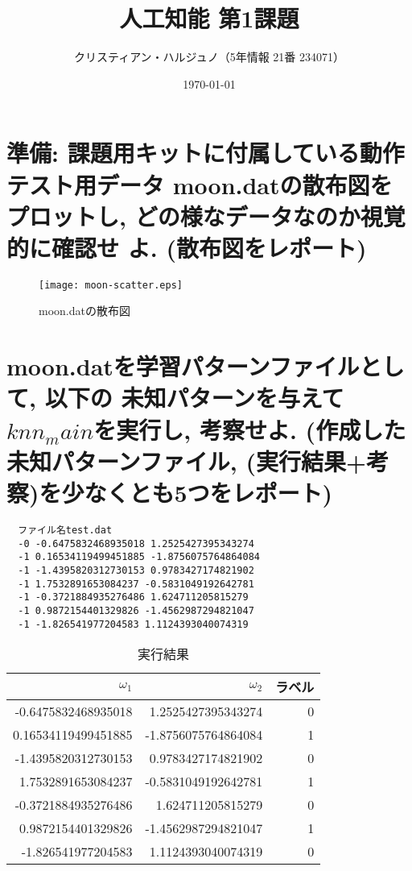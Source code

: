 \documentclass[a4j, 10pt]{jarticle}
\begin{document}
\begin{titlepage}
  
  \title{人工知能 第1課題}
  \author{クリスティアン・ハルジュノ（5年情報 21番 234071）}
  \date{\today}
  \maketitle
\end{titlepage}

\section{準備: 課題用キットに付属している動作テスト用データ moon.datの散布図をプロットし, どの様なデータなのか視覚的に確認せ
よ. (散布図をレポート)}
\begin{figure}[H]
  \centering
  \texttt{[image: moon-scatter.eps]}
  \caption{moon.datの散布図}\label{scatterplot}
\end{figure}

\section{moon.datを学習パターンファイルとして, 以下の 未知パターンを与えて$knn_main$を実行し, 考察せよ. (作成した未知パターンファイル, (実行結果+考察)を少なくとも5つをレポート)}

\begin{verbatim}
  ファイル名test.dat
  -0 -0.6475832468935018 1.2525427395343274
  -1 0.16534119499451885 -1.8756075764864084
  -1 -1.4395820312730153 0.9783427174821902
  -1 1.7532891653084237 -0.5831049192642781
  -1 -0.3721884935276486 1.624711205815279
  -1 0.9872154401329826 -1.4562987294821047
  -1 -1.826541977204583 1.1124393040074319
\end{verbatim}

\begin{table}[H]
  \centering
  \caption{実行結果}
  \begin{tabular}{|r|r|r|}
  \hline
  $\omega_1$ & $\omega_2$ & ラベル \\
  \hline
  -0.6475832468935018 &  1.2525427395343274 & 0 \\
  0.16534119499451885 & -1.8756075764864084 & 1 \\
  -1.4395820312730153 &  0.9783427174821902 & 0 \\
  1.7532891653084237 & -0.5831049192642781 & 1 \\
  -0.3721884935276486 &  1.624711205815279  & 0 \\
  0.9872154401329826 & -1.4562987294821047 & 1 \\
  -1.826541977204583  &  1.1124393040074319 & 0 \\
  \hline
  \end{tabular}
\end{table}
\end{document}
